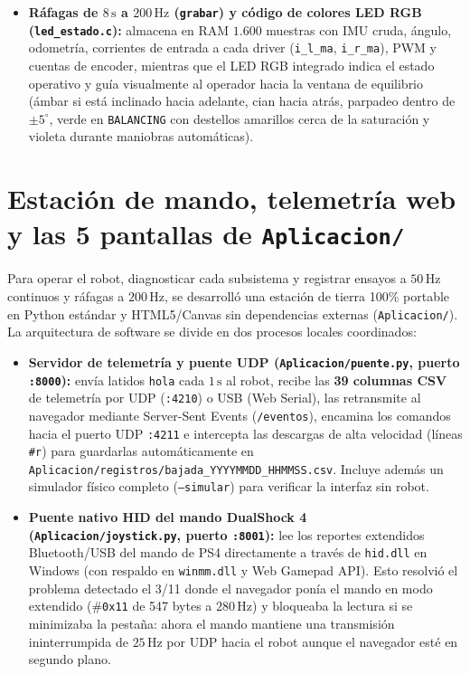 \documentclass[11pt,a4paper]{report}
\newcommand{\ud}[1]{\,\mathrm{#1}}
\begin{document}
\begin{enumerate}[leftmargin=1.6em]
\begin{itemize}[leftmargin=1.4em]
            motivo por consola.
      \item \textbf{Ráfagas de $8\ud{s}$ a $200\ud{Hz}$ (\texttt{grabar}) y código de colores LED RGB (\texttt{led\_estado.c}):}
            almacena en RAM $1.600$ muestras con IMU cruda, ángulo, odometría, corrientes de
            entrada a cada driver (\texttt{i\_l\_ma}, \texttt{i\_r\_ma}), PWM y cuentas de encoder,
            mientras que el LED RGB integrado indica el estado operativo y guía visualmente al
            operador hacia la ventana de equilibrio (ámbar si está inclinado hacia adelante, cian
            hacia atrás, parpadeo dentro de $\pm 5^\circ$, verde en \texttt{BALANCING} con destellos
            amarillos cerca de la saturación y violeta durante maniobras automáticas).
      \end{itemize}
\end{enumerate}

\section{Estación de mando, telemetría web y las 5 pantallas de \texttt{Aplicacion/}}\label{sec:pantallas_app}

Para operar el robot, diagnosticar cada subsistema y registrar ensayos a $50\ud{Hz}$ continuos y
ráfagas a $200\ud{Hz}$, se desarrolló una estación de tierra 100\% portable en Python estándar
y HTML5/Canvas sin dependencias externas (\texttt{Aplicacion/}). La arquitectura de software se
divide en dos procesos locales coordinados:
\begin{itemize}[leftmargin=1.5em]
\item \textbf{Servidor de telemetría y puente UDP (\texttt{Aplicacion/puente.py}, puerto \texttt{:8000}):}
      envía latidos \texttt{hola} cada $1\ud{s}$ al robot, recibe las \textbf{39 columnas CSV} de
      telemetría por UDP (\texttt{:4210}) o USB (Web Serial), las retransmite al navegador mediante
      Server-Sent Events (\texttt{/eventos}), encamina los comandos hacia el puerto UDP \texttt{:4211}
      e intercepta las descargas de alta velocidad (líneas \texttt{\#r}) para guardarlas
      automáticamente en \texttt{Aplicacion/registros/bajada\_YYYYMMDD\_HHMMSS.csv}. Incluye además
      un simulador físico completo (\texttt{--simular}) para verificar la interfaz sin robot.
\item \textbf{Puente nativo HID del mando DualShock 4 (\texttt{Aplicacion/joystick.py}, puerto \texttt{:8001}):}
      lee los reportes extendidos Bluetooth/USB del mando de PS4 directamente a través de
      \texttt{hid.dll} en Windows (con respaldo en \texttt{winmm.dll} y Web Gamepad API). Esto
      resolvió el problema detectado el 3/11 donde el navegador ponía el mando en modo extendido
      (\#\texttt{0x11} de 547 bytes a $280\ud{Hz}$) y bloqueaba la lectura si se minimizaba la
      pestaña: ahora el mando mantiene una transmisión ininterrumpida de $25\ud{Hz}$ por UDP hacia
      el robot aunque el navegador esté en segundo plano.
\end{itemize}
\end{document}
